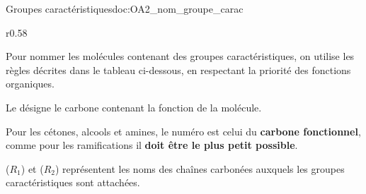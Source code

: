 \newpage
\vspace*{-28pt}

\begin{doc}{Groupes caractéristiques}{doc:OA2_nom_groupe_carac}
  \vspace*{-4pt}
  \begin{wrapfigure}[5]{r}{0.58\linewidth}
    \vspace*{-30pt}
    \centering
  \end{wrapfigure}
  Pour nommer les molécules contenant des groupes caractéristiques, on utilise les règles décrites dans le tableau ci-dessous, en respectant la priorité des fonctions organiques.
  
  \begin{encart}
    Le  désigne le carbone contenant la fonction de la molécule.
  \end{encart}
  
  Pour les cétones, alcools et amines, le numéro est celui du \textbf{carbone fonctionnel}, comme pour les ramifications il \textbf{doit être le plus petit possible}.
  
  ($R_1$) et ($R_2$) représentent les noms des chaînes carbonées auxquels les groupes caractéristiques sont attachées. 


\end{doc}
